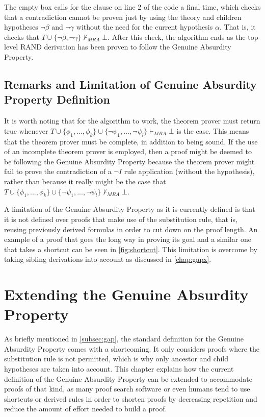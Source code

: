 \documentclass[11pt,twoside,a4paper]{report}
\begin{document}
The empty box calls for the clause on line 2 of the code a final time, which checks that a contradiction cannot be proven just by using the theory and children hypotheses $\neg\beta$ and $\neg\gamma$ without the need for the current hypothesis $\alpha$. That is, it checks that $T\cup\{\neg\beta, \neg\gamma\}\nvdash_{MRA}\bot$. After this check, the algorithm ends as the top-level RAND derivation has been proven to follow the Genuine Absurdity Property.

\section{Remarks and Limitation of Genuine Absurdity Property Definition}
It is worth noting that for the algorithm to work, the theorem prover must return true whenever $T\cup\{\phi_1, ..., \phi_k\}\cup\{\neg\psi_1, ..., \neg\psi_l\}\vdash_{MRA}\bot$ is the case. This means that the theorem prover must be complete, in addition to being sound. If the use of an incomplete theorem prover is employed, then a proof might be deemed to be following the Genuine Absurdity Property because the theorem prover might fail to prove the contradiction of a $\neg I$ rule application (without the hypothesis), rather than because it really might be the case that $T\cup\{\phi_1, ..., \phi_k\}\cup\{\neg\psi_1, ..., \neg\psi_l\}\nvdash_{MRA}\bot$. 

A limitation of the Genuine Absurdity Property as it is currently defined is that it is not defined over proofs that make use of the substitution rule, that is, reusing previously derived formulas in order to cut down on the proof length. An example of a proof that goes the long way in proving its goal and a similar one that takes a shortcut can be seen in \autoref{fig:shortcut}. This limitation is overcome by taking sibling derivations into account as discussed in \autoref{chap:gapx}.

\chapter{Extending the Genuine Absurdity Property}
\label{chap:gapx}
As briefly mentioned in \autoref{subsec:gap}, the standard definition for the Genuine Absurdity Property comes with a shortcoming. It only considers proofs where the substitution rule is not permitted, which is why only ancestor and child hypotheses are taken into account. This chapter explains how the current definition of the Genuine Absurdity Property can be extended to accommodate proofs of that kind, as many proof search software or even humans tend to use shortcuts or derived rules in order to shorten proofs by decreasing repetition and reduce the amount of effort needed to build a proof.
\end{document}
